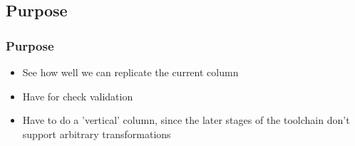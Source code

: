 \documentclass{beamer}
\begin{document}
\begin{frame}
\begin{figure}[h]
  \end{figure}
\end{frame}

\subsection{Purpose}
\begin{frame}
  \frametitle{Purpose}
  \begin{itemize}
     \item See how well we can replicate the current column
     \item Have for check validation
     \item Have to do a 'vertical' column, since the later stages of the toolchain don't support arbitrary transformations
  \end{itemize}
\end{frame}
\end{document}
